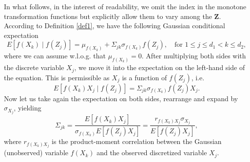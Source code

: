 In what follows, in the interest of readability, we omit the index in the monotone transformation functions but explicitly allow them to vary among the $\mathbf{Z}$. According to Definition \ref{def1}, we have the following Gaussian conditional expectation
\begin{equation}
    E[f(X_k) \mid f(Z_j)] = \mu_{f(X_k)} + \Sigma_{jk}\sigma_{f(X_k)} f(Z_j), \quad \text{for } 1 \leq j \leq d_1 < k \leq d_2,
\end{equation}
where we can assume w.l.o.g. that $\mu_{f(X_k)} = 0$. After multiplying both sides with the discrete variable $X_j$, we move it into the expectation on the left-hand side of the equation. This is permissible as $X_j$ is a function of $f(Z_j)$, i.e.
\begin{equation*}
    E[f(X_k)X_j \mid f(Z_j)] = \Sigma_{jk}\sigma_{f(X_k)} f(Z_j)X_j.
\end{equation*}
Now let us take again the expectation on both sides, rearrange and expand by $\sigma_{X_j}$, yielding
\begin{equation}\label{population_polyserial_nonpara}
        \Sigma_{jk} = \frac{E[f(X_k)X_j]}{\sigma_{f(X_k)} E[f(Z_j)X_j]} = \frac{r_{f(X_k)X_j}\sigma_{X_j}}{E[f(Z_j)X_j]},
\end{equation}
where $r_{f(X_k)X_j}$ is the product-moment correlation between the Gaussian (unobserved) variable $f(X_k)$ and the observed discretized variable $X_j$.

